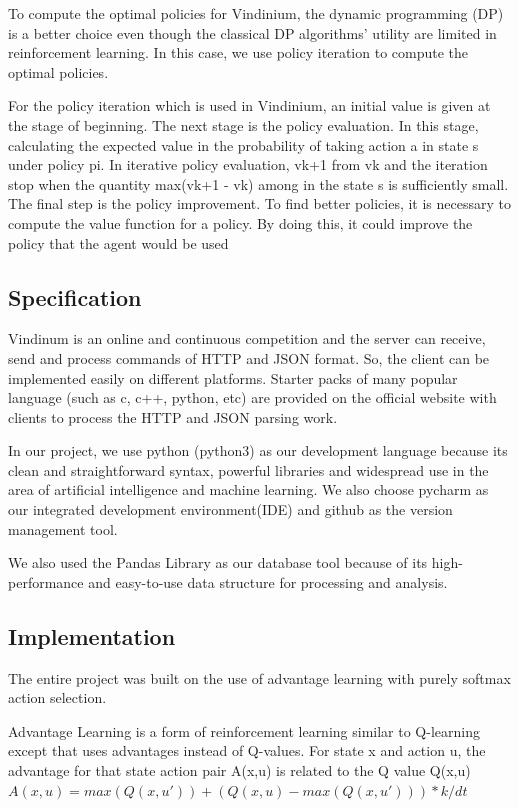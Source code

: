 To compute the optimal policies for Vindinium, the dynamic programming (DP) is a better choice even though the classical DP algorithms' utility are limited in reinforcement learning. In this case, we use policy iteration to compute the optimal policies.

For the policy iteration which is used in Vindinium, an initial value is given at the stage of beginning. The next stage is the policy evaluation. In this stage, calculating the expected value in the probability of taking action a in state s under policy  pi. In iterative policy evaluation, vk+1 from vk and the iteration stop when the quantity max(vk+1 - vk) among in the state s is sufficiently small. The final step is the policy improvement. To find better policies, it is necessary to compute the value function for a policy. By doing this, it could improve the policy that the agent would be used

\subsection{ Specification}
Vindinum is an online and continuous competition and the server can receive, send and process commands of HTTP and JSON format. So, the client can be implemented easily on different platforms. Starter packs of many popular language (such as c, c++, python, etc) are provided on the official website with clients to process the HTTP and JSON parsing work.
 
In our project, we use python (python3) as our development language because its clean and straightforward syntax, powerful libraries and widespread use in the area of artificial intelligence and machine learning. We also choose pycharm as our integrated development environment(IDE) and github as the version management tool.
 
We also used the Pandas Library as our database tool because of its high-performance and easy-to-use data structure for processing and analysis.

\subsection{Implementation}

The entire project was built on the use of advantage learning with purely softmax action selection. 

Advantage Learning is a form of reinforcement learning similar to Q-learning except that uses advantages instead of Q-values. For state x and action u, the advantage for that state action pair A(x,u)  is related to the Q value Q(x,u)
$A(x,u)=max(Q(x,u')) + (Q(x,u) -max(Q(x,u'))) * k/dt$

